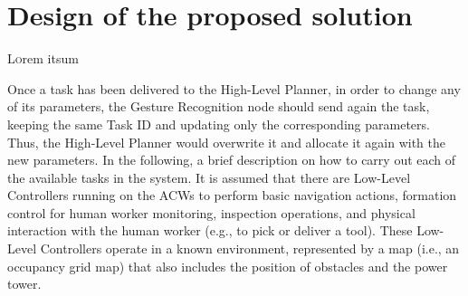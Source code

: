 \chapter{Design of the proposed solution}
\label{ch:DesignOfTheProposedSolution}
\lettrine[lraise=-0.1, lines=2, loversize=0.2]{L}{o}rem itsum



Once a task has been delivered to the High-Level Planner, in order to change any of its parameters, the Gesture Recognition node should send again the task, keeping the same Task ID and updating only the corresponding parameters. Thus, the High-Level Planner would overwrite it and allocate it again with the new parameters. In the following, a brief description on how to carry out each of the available tasks in the system. It is assumed that there are Low-Level Controllers running on the \glspl{ACW} to perform basic navigation actions, formation control for human worker monitoring, inspection operations, and physical interaction with the human worker (e.g., to pick or deliver a tool). These Low-Level Controllers operate in a known environment, represented by a map (i.e., an occupancy grid map) that also includes the position of obstacles and the power tower.


